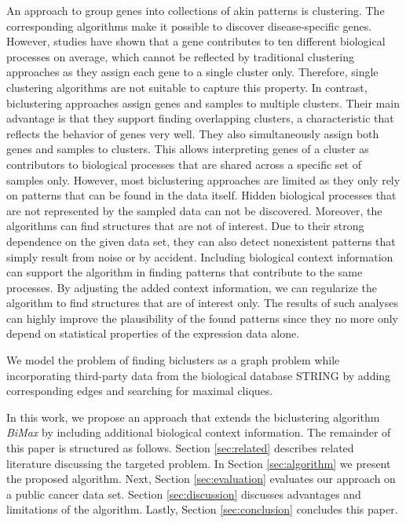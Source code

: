 \documentclass[10pt, conference, compsocconf]{IEEEtran}
\begin{document}
An approach to group genes into collections of akin patterns is clustering.
The corresponding algorithms make it possible to discover disease-specific genes.
However, studies have shown that a gene contributes to ten different biological processes on average, which cannot be reflected by traditional clustering approaches as they assign each gene to a single cluster only.
Therefore, single clustering algorithms are not suitable to capture this property.
In contrast, biclustering approaches assign genes and samples to multiple clusters.
Their main advantage is that they support finding overlapping clusters, a characteristic that reflects
the behavior of genes very well. They also simultaneously assign both genes and samples to
clusters. This allows interpreting genes of a cluster as contributors to biological processes
that are shared across a specific set of samples only.
However, most biclustering approaches are limited as they only rely on patterns that can be found in the data itself.
Hidden biological processes that are not represented by the sampled data can not be discovered.
Moreover, the algorithms can find structures that are not of interest.
Due to their strong dependence on the given data set, they can also detect nonexistent patterns that simply result from noise or by accident.
Including biological context information can support the algorithm in finding patterns that contribute to the same processes.
By adjusting the added context information, we can regularize the algorithm to find structures that are of interest only.
The results of such analyses can highly improve the plausibility of the found patterns since they no more
only depend on statistical properties of the expression data alone.

We model the problem of finding biclusters as a graph problem while incorporating third-party data from the biological database STRING by adding corresponding edges and searching for maximal cliques.

In this work, we propose an approach that extends the biclustering algorithm \textit{BiMax} by including additional biological context information.
The remainder of this paper is structured as follows.
Section \ref{sec:related} describes related literature discussing the targeted problem.
In Section \ref{sec:algorithm} we present the proposed algorithm.
Next, Section \ref{sec:evaluation} evaluates our approach on a public cancer data set.
Section \ref{sec:discussion} discusses advantages and limitations of the algorithm.
Lastly, Section \ref{sec:conclusion} concludes this paper.
\end{document}

